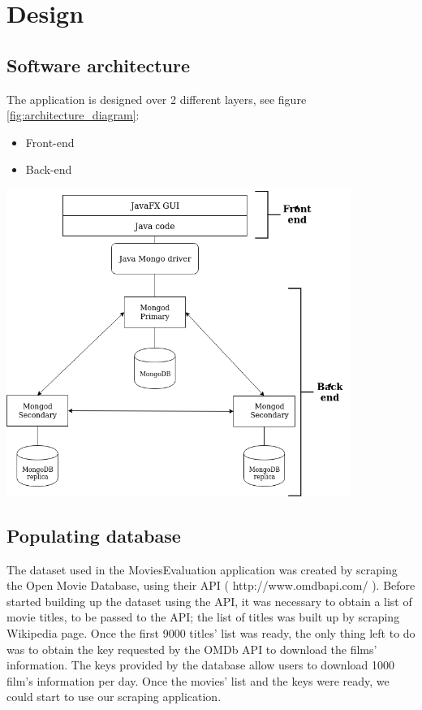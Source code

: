\documentclass[a4paper, oneside]{article}
\begin{document}
\clearpage
\section{Design}

\subsection{Software architecture}
The application is designed over 2 different layers, see figure \ref{fig:architecture_diagram}:
\begin{itemize}
\item Front-end
\item Back-end
\end{itemize}
\vspace{5mm}
\begin{minipage}{\linewidth}
\begin{center}
\vspace{1mm}
\includegraphics[height = 100mm]{./images/diagrams/architecture_diagram.png} 
\vspace{6mm}
\label{fig:architecture_diagram}
\end{center}
\end{minipage}
\vspace{7mm}

\subsection{Populating database}
The dataset used in the MoviesEvaluation application was created by scraping the Open Movie Database, using their API ( http://www.omdbapi.com/ ). Before started building up the dataset using the API, it was necessary to obtain a list of movie titles, to be passed to the API; the list of titles was built up by scraping Wikipedia page. Once the first 9000 titles’ list was ready, the only thing left to do was to obtain the key requested by the OMDb API to download the films’ information. The keys provided by the database allow users to download 1000 film’s information per day. Once the movies’ list and the keys were ready, we could start to use our scraping application.\\
\end{document}
